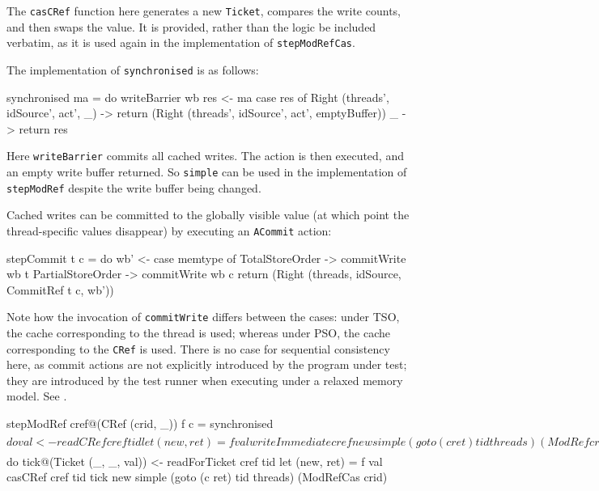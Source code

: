 The \verb|casCRef| function here generates a new \verb|Ticket|,
compares the write counts, and then swaps the value. It is provided,
rather than the logic be included verbatim, as it is used again in the
implementation of \verb|stepModRefCas|.

The implementation of \verb|synchronised| is as follows:

\begin{haskellcode}
synchronised ma = do
  writeBarrier wb
  res <- ma
  case res of
    Right (threads', idSource', act', _) -> return
      (Right (threads', idSource', act', emptyBuffer))
    _ -> return res
\end{haskellcode}

Here \verb|writeBarrier| commits all cached writes. The action is then
executed, and an empty write buffer returned. So \verb|simple| can be
used in the implementation of \verb|stepModRef| despite the write
buffer being changed.

Cached writes can be committed to the globally visible value (at which
point the thread-specific values disappear) by executing an
\verb|ACommit| action:

\begin{haskellcode}
stepCommit t c = do
  wb' <- case memtype of
    TotalStoreOrder   -> commitWrite wb t
    PartialStoreOrder -> commitWrite wb c
  return (Right (threads, idSource, CommitRef t c, wb'))
\end{haskellcode}

Note how the invocation of \verb|commitWrite| differs between the
cases: under TSO, the cache corresponding to the thread is used;
whereas under PSO, the cache corresponding to the \verb|CRef| is
used. There is no case for sequential consistency here, as commit
actions are not explicitly introduced by the program under test; they
are introduced by the test runner when executing under a relaxed
memory model. See .

\begin{haskellcode}
stepModRef cref@(CRef (crid, _)) f c = synchronised $ do
  val <- readCRef cref tid
  let (new, ret) = f val
  writeImmediate cref new
  simple (goto (c ret) tid threads) (ModRef crid)

stepModRefCas cref@(CRef (crid, _)) f c = synchronised $ do
  tick@(Ticket (_, _, val)) <- readForTicket cref tid
  let (new, ret) = f val
  casCRef cref tid tick new
  simple (goto (c ret) tid threads) (ModRefCas crid)
\end{haskellcode}

